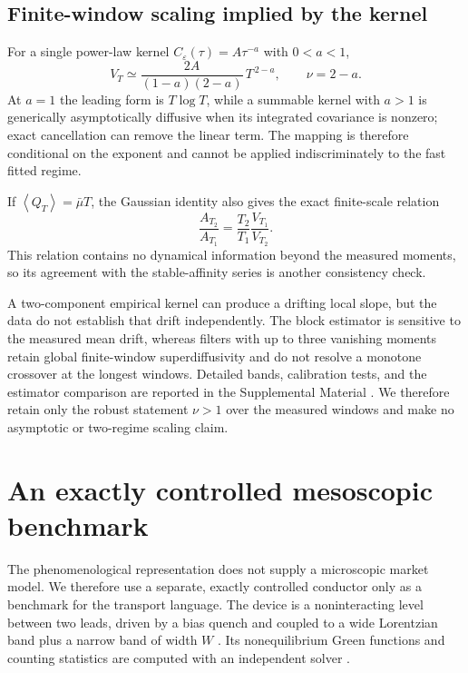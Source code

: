 \documentclass[aps,pre,twocolumn,superscriptaddress,floatfix,nofootinbib]{revtex4-2}
\newcommand{\eps}{\varepsilon}
\newcommand{\avg}[1]{\left\langle #1 \right\rangle}
\begin{document}
\subsection{Finite-window scaling implied by the kernel}
\label{model:sec:crossover}

For a single power-law kernel $C_\eps(\tau)=A\tau^{-a}$ with $0<a<1$,
\begin{equation}
  V_T\simeq\frac{2A}{(1-a)(2-a)}\,T^{\,2-a},
  \qquad \nu=2-a .
  \label{model:eq:varscaling}
\end{equation}
At $a=1$ the leading form is $T\log T$, while a summable kernel with $a>1$
is generically asymptotically diffusive when its integrated covariance is
nonzero; exact cancellation can remove the linear term. The mapping is therefore conditional on the
exponent and cannot be applied indiscriminately to the fast fitted regime.

If $\avg{Q_T}=\bar\mu T$, the Gaussian identity also gives the exact
finite-scale relation
\begin{equation}
  \frac{A_{T_2}}{A_{T_1}}
  =\frac{T_2}{T_1}\frac{V_{T_1}}{V_{T_2}} .
  \label{model:eq:Aexact}
\end{equation}
This relation contains no dynamical information beyond the measured moments,
so its agreement with the stable-affinity series is another consistency check.

A two-component empirical kernel can produce a drifting local slope, but the
data do not establish that drift independently. The block estimator is
sensitive to the measured mean drift, whereas filters with up to three
vanishing moments retain global finite-window superdiffusivity and do not
resolve a monotone crossover at the longest windows. Detailed bands,
calibration tests, and the estimator comparison are reported in the
Supplemental Material \cite{supplement}. We therefore retain only the robust
statement $\nu>1$ over the measured windows and make no asymptotic or
two-regime scaling claim.

\section{An exactly controlled mesoscopic benchmark}
\label{model:sec:device}

The phenomenological representation does not supply a microscopic market
model. We therefore use a separate, exactly controlled conductor only as a
benchmark for the transport language. The device is a noninteracting level
between two leads, driven by a bias quench and coupled to a wide Lorentzian
band plus a narrow band of width $W$ \cite{jauho1994,levitov1996,blanter2000}.
Its nonequilibrium Green functions and counting statistics are computed with
an independent solver \cite{code_qteom}.
\end{document}
